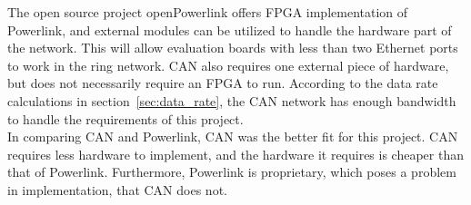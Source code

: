 The open source project openPowerlink offers FPGA implementation of Powerlink, and external modules can be utilized to handle the hardware part of the network.
This will allow evaluation boards with less than two Ethernet ports to work in the ring network. 
CAN also requires one external piece of hardware, but does not necessarily require an FPGA to run. 
According to the data rate calculations in section~\ref{sec:data_rate}, the CAN network has enough bandwidth to handle the requirements of this project. \\

In comparing CAN and Powerlink, CAN was the better fit for this project.
CAN requires less hardware to implement, and the hardware it requires is cheaper than that of Powerlink. 
Furthermore, Powerlink is proprietary, which poses a problem in implementation, that CAN does not.
